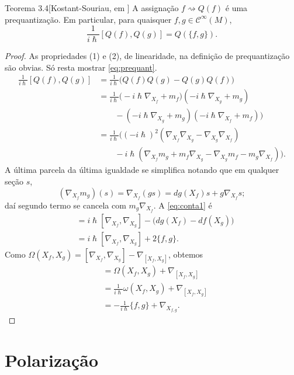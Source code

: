 \begin{thing5}{Teorema 3.4}[Kostant-Souriau, em \cite{wang}]\leavevmode
A assignação $f \rightsquigarrow Q(f)$ é uma prequantização. Em particular, para quaisquer $f,g \in \mathcal{C}^\infty(M)$,
\begin{equation}\label{eq:prequant}\frac{1}{i\hslash}[Q(f),Q(g)]=Q(\{f,g\}).
\end{equation}
\end{thing5}

\begin{proof}\leavevmode
As propriedades (1) e (2), de linearidade, na definição de prequantização são obvias. Só resta mostrar  \cref{eq:prequant}.
\begin{equation}\label{eq:conta1}
\begin{aligned}
	\frac{1}{i \hslash}[Q(f),Q(g)]&=\frac{1}{i \hslash}\Big(Q(f)Q(g)-Q(g)Q(f)\Big)\\
	&=\frac{1}{i \hslash}\Big(-i \hslash \nabla_{X_f}+ m_f)(-i \hslash \nabla_{X_g}+m_g)\\& \qquad -(-i \hslash \nabla_{X_g}+m_g)(-i \hslash \nabla_{X_f}+m_f) \Big)\\
	&=\frac{1}{i \hslash} \Big( (-i \hslash)^2(\nabla_{X_f}\nabla_{X_g}-\nabla_{X_g}\nabla_{X_f})\\& \qquad -i\hslash (\nabla_{X_f}m_g+m_f \nabla_{X_g}-\nabla_{X_g}m_f-m_g\nabla_{X_f}) \Big).
	\end{aligned}	\end{equation}
A última parcela da última igualdade se simplifica notando que em qualquer seção $s$,
\[\left(\nabla_{X_f}m_g\right)(s)=\nabla_{X_f}(gs)=dg(X_f)s+g\nabla_{X_f}s;\]
daí segundo termo se cancela com $m_{g}\nabla_{X_f}$. A \cref{eq:conta1} é
\begin{align*}
&=i \hslash [\nabla_{X_f},\nabla_{X_{g}}]-\Big(dg(X_f)-df(X_g) \Big)\\
&=i \hslash [\nabla_{X_f},\nabla_{X_g}]+2\{f,g\}.
\end{align*}
Como $\Omega(X_f,X_g)=[\nabla_{X_f},\nabla_{X_g}]-\nabla_{[X_{f},X_g]}$, obtemos
\begin{align*}[\nabla_{X_f},\nabla_{X_g}]&=\Omega(X_f,X_g)+\nabla_{[X_f,X_g]}\\
	&=\frac{1}{i \hslash}\omega(X_f,X_g)+\nabla_{[X_f,X_g]}\\
	&=-\frac{1}{i \hslash}\{f,g\}+\nabla_{X_{f,g}}.
\end{align*}
\end{proof}

\iffalse
\section{Polarização}

